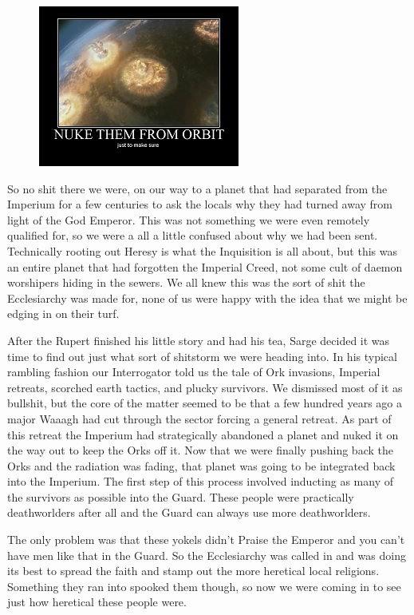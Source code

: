 \begin{figure}
	\begin{center}
		\includegraphics[width=\figwidth]{pics/6/2.png}
	\end{center}
\end{figure}
So no shit there we were, on our way to a planet that had separated from the Imperium for a few centuries to ask the locals why they had turned away from light of the God Emperor. 
This was not something we were even remotely qualified for, so we were a all a little confused about why we had been sent. 
Technically rooting out Heresy is what the Inquisition is all about, but this was an entire planet that had forgotten the Imperial Creed, not some cult of daemon worshipers hiding in the sewers. 
We all knew this was the sort of shit the Ecclesiarchy was made for, none of us were happy with the idea that we might be edging in on their turf.

After the Rupert finished his little story and had his tea, Sarge decided it was time to find out just what sort of shitstorm we were heading into. 
In his typical rambling fashion our Interrogator told us the tale of Ork invasions, Imperial retreats, scorched earth tactics, and plucky survivors. 
We dismissed most of it as bullshit, but the core of the matter seemed to be that a few hundred years ago a major Waaagh had cut through the sector forcing a general retreat. 
As part of this retreat the Imperium had strategically abandoned a planet and nuked it on the way out to keep the Orks off it. 
Now that we were finally pushing back the Orks and the radiation was fading, that planet was going to be integrated back into the Imperium. 
The first step of this process involved inducting as many of the survivors as possible into the Guard. 
These people were practically deathworlders after all and the Guard can always use more deathworlders.

The only problem was that these yokels didn't Praise the Emperor and you can't have men like that in the Guard. 
So the Ecclesiarchy was called in and was doing its best to spread the faith and stamp out the more heretical local religions. 
Something they ran into spooked them though, so now we were coming in to see just how heretical these people were.

